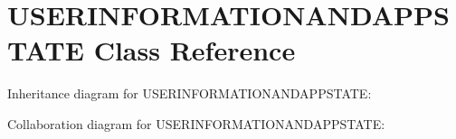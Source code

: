 \hypertarget{interface_u_s_e_r_i_n_f_o_r_m_a_t_i_o_n_a_n_d_a_p_p_s_t_a_t_e}{
\section{\-U\-S\-E\-R\-I\-N\-F\-O\-R\-M\-A\-T\-I\-O\-N\-A\-N\-D\-A\-P\-P\-S\-T\-A\-T\-E \-Class \-Reference}
\label{interface_u_s_e_r_i_n_f_o_r_m_a_t_i_o_n_a_n_d_a_p_p_s_t_a_t_e}
}


\-Inheritance diagram for \-U\-S\-E\-R\-I\-N\-F\-O\-R\-M\-A\-T\-I\-O\-N\-A\-N\-D\-A\-P\-P\-S\-T\-A\-T\-E\-:


\-Collaboration diagram for \-U\-S\-E\-R\-I\-N\-F\-O\-R\-M\-A\-T\-I\-O\-N\-A\-N\-D\-A\-P\-P\-S\-T\-A\-T\-E\-:
